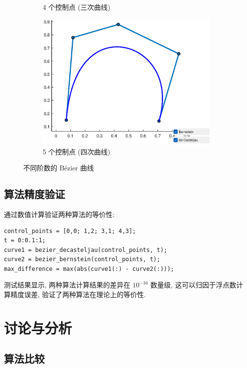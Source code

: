 \documentclass[12pt,a4paper]{report}
\begin{document}
\begin{figure}[htbp]
\begin{subfigure}{0.3\textwidth}
                    \caption{4 个控制点 (三次曲线)}
                \end{subfigure}
                \hfill
                \begin{subfigure}{0.3\textwidth}
                    \centering
                    \includegraphics[width=\textwidth]{fig/5_points.eps}
                    \caption{5 个控制点 (四次曲线)}
                \end{subfigure}
                \caption{不同阶数的 Bézier 曲线}
            \end{figure}

        \section{算法精度验证}
            通过数值计算验证两种算法的等价性:
            \begin{verbatim}
control_points = [0,0; 1,2; 3,1; 4,3];
t = 0:0.1:1;
curve1 = bezier_decasteljau(control_points, t);
curve2 = bezier_bernstein(control_points, t);
max_difference = max(abs(curve1(:) - curve2(:)));
            \end{verbatim}
            
            测试结果显示, 两种算法计算结果的差异在 $10^{-16}$ 数量级, 这可以归因于浮点数计算精度误差, 验证了两种算法在理论上的等价性.

    \chapter{讨论与分析}
        \section{算法比较}
\end{document}
